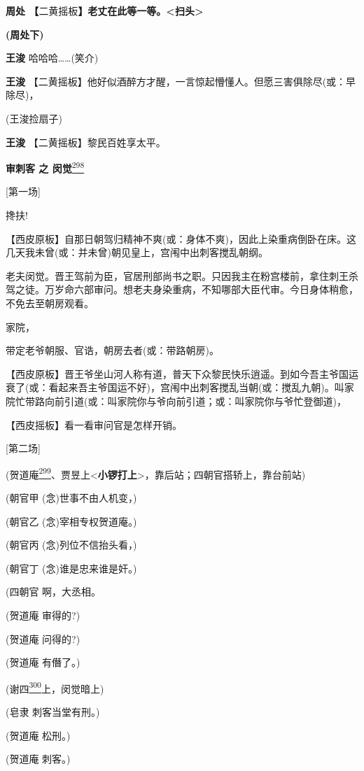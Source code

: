 \textbf{周处
【}二黄摇板\textbf{】老丈在此等一等。\textless{}扫头\textgreater{}}

\textbf{(周处下)}

\textbf{王浚} 哈哈哈\ldots{}\ldots{}(笑介)

\textbf{王浚}
【二黄摇板】他好似酒醉方才醒，一言惊起懵懂人。但愿三害俱除尽(或：早除尽)，

(王浚捡扇子)

\textbf{王浚} 【二黄摇板】黎民百姓享太平。

\textbf{审刺客 之 闵觉}\protect\hyperlink{fn298}{\textsuperscript{298}}

{[}第一场{]}

搀扶!

【西皮原板】自那日朝驾归精神不爽(或：身体不爽)，因此上染重病倒卧在床。这几天我未曾(或：并未曾)朝见皇上，宫闱中出刺客搅乱朝纲。

老夫闵觉。晋王驾前为臣，官居刑部尚书之职。只因我主在粉宫楼前，拿住刺王杀驾之徒。万岁命六部审问。想老夫身染重病，不知哪部大臣代审。今日身体稍愈，不免去至朝房观看。

家院，

带定老爷朝服、官诰，朝房去者(或：带路朝房)。

【西皮原板】晋王爷坐山河人称有道，普天下众黎民快乐逍遥。到如今吾主爷国运衰了(或：看起来吾主爷国运不好)，宫闱中出刺客搅乱当朝(或：搅乱九朝)。叫家院忙带路向前引道(或：叫家院你与爷向前引道；或：叫家院你与爷忙登御道)，

【西皮摇板】看一看审问官是怎样开销。

{[}第二场{]}

(贺道庵\protect\hyperlink{fn299}{\textsuperscript{299}}、贾昱上\textless{}\textbf{小锣打上}\textgreater{}，靠后站；四朝官搭轿上，靠台前站)

(朝官甲 (念)世事不由人机变，)

(朝官乙 (念)宰相专权贺道庵。)

(朝官丙 (念)列位不信抬头看，)

(朝官丁 (念)谁是忠来谁是奸。)

(四朝官 啊，大丞相。

(贺道庵 审得的?)

(贺道庵 问得的?)

(贺道庵 有僭了。)

(谢四\protect\hyperlink{fn300}{\textsuperscript{300}}上，闵觉暗上)

(皂隶 刺客当堂有刑。)

(贺道庵 松刑。)

(贺道庵 刺客。)

